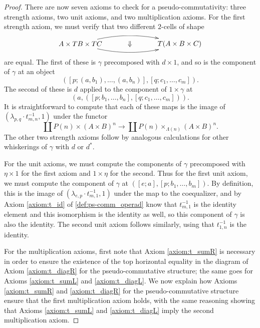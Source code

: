 \begin{proof}
There are now seven axioms to check for a pseudo-commutativity:  three strength axioms, two unit axioms, and two multiplication axioms. For the first strength axiom, we must verify that two different $2$-cells of shape
  \[
    \xy
      (0,0)*+{A \times TB \times TC}="0";
      (50,0)*+{T(A \times B \times C)}="1";
      {\ar@/^1pc/ "0"; "1"};
      {\ar@/_1pc/ "0"; "1"};
      (25,0)*{\Downarrow}
    \endxy
  \]
are equal. The first of these is $\gamma$ precomposed with $d \times 1$, and so is the component of $\gamma$ at an object
  \[
    \left( [p;(a,b_1),\ldots,(a,b_n)], [q; c_{1}, \ldots, c_{m}] \right).
  \]
The second of these is $d$ applied to the component of $1 \times \gamma$ at
  \[
    \left(a, ([p;b_1,\ldots,b_n], [q; c_{1}, \ldots, c_{m}]) \right).
  \]
It is straightforward to compute that each of these maps is the image of $\left(\lambda_{p,q}\cdot t_{m,n}^{-1},1\right)$ under the functor
  \[
    \coprod P(n) \times (A \times B)^{n} \rightarrow \coprod P(n) \times_{\Lambda(n)} (A \times B)^{n}.
  \]
The other two strength axioms follow by analogous calculations for other whiskerings of $\gamma$ with $d$ or $d^{*}$.

For the unit axioms, we must compute the components of $\gamma$ precomposed with $\eta \times 1$ for the first axiom and $1 \times \eta$ for the second. Thus for the first unit axiom, we must compute the component of $\gamma$ at $\left( [e;a], [p; b_{1}, \ldots, b_{m}] \right)$. By definition, this is the image of $(\lambda_{e,p}\cdot t^{-1}_{m,1}, 1)$ under the map to the coequalizer, and by Axiom \ref{axiom:t_id} of \ref{def:ps-comm_operad} know that $t^{-1}_{m,1}$ is the identity element and this isomorphism is the identity as well, so this component of $\gamma$ is also the identity. The second unit axiom follows similarly, using that $t^{-1}_{1,n}$ is the identity.

For the multiplication axioms, first note that Axiom \ref{axiom:t_sumR} is necessary in order to ensure the existence of the top horizontal equality in the diagram of Axiom \ref{axiom:t_diagR} for the pseudo-commutative structure; the same goes for Axioms \ref{axiom:t_sumL} and \ref{axiom:t_diagL}. We now explain how Axioms \ref{axiom:t_sumR} and \ref{axiom:t_diagR} for the pseudo-commutative structure ensure that the first multiplication axiom holds, with the same reasoning showing that Axioms \ref{axiom:t_sumL} and \ref{axiom:t_diagL} imply the second multiplication axiom.


\end{proof}
